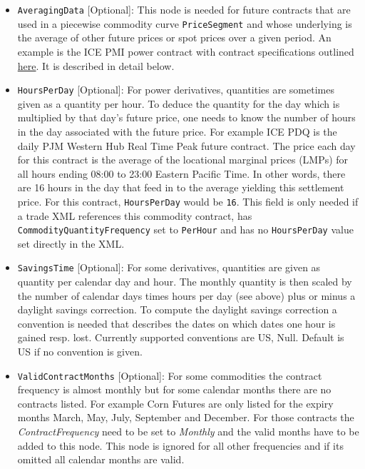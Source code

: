 \begin{itemize}
\item \lstinline!AveragingData! [Optional]: This node is needed for future contracts that are used in a piecewise commodity curve \lstinline!PriceSegment! and whose underlying is the average of other future prices or spot prices over a given period. An example is the ICE PMI power contract with contract specifications outlined \href{https://www.theice.com/products/6590369/PJM-Western-Hub-Real-Time-Peak-1-MW-Fixed-Price-Future}{here}. It is described in detail below.
\item \lstinline!HoursPerDay! [Optional]: For power derivatives, quantities are sometimes given as a quantity per hour. To deduce the quantity for the day which is multiplied by that day's future price, one needs to know the number of hours in the day associated with the future price. For example ICE PDQ is the daily PJM Western Hub Real Time Peak future contract. The price each day for this contract is the average of the locational marginal prices (LMPs) for all hours ending 08:00 to 23:00 Eastern Pacific Time. In other words, there are 16 hours in the day that feed in to the average yielding this settlement price. For this contract, \lstinline!HoursPerDay! would be \lstinline!16!. This field is only needed if a trade XML references this commodity contract, has \lstinline!CommodityQuantityFrequency! set to \lstinline!PerHour! and has no \lstinline!HoursPerDay! value set directly in the XML.
\item \lstinline!SavingsTime! [Optional]: For some derivatives, quantities are given as quantity per calendar day and hour. The monthly quantity is then scaled by the number of calendar days times hours per day (see above) plus or minus a daylight savings correction. To compute the daylight savings correction a convention is needed that describes the dates on which dates one hour is gained resp. lost. Currently supported conventions are US, Null. Default is US if no convention is given.
\item \lstinline!ValidContractMonths! [Optional]: For some commodities the contract frequency is almost monthly but for some calendar months there are no contracts listed. For example Corn Futures are only listed for the expiry months March, May, July, September and December. For those contracts the \emph{ContractFrequency} need to be set to \emph{Monthly} and the valid months have to be added to this node. This node is ignored for all other frequencies and if its omitted all calendar months are valid.
\end{itemize}

